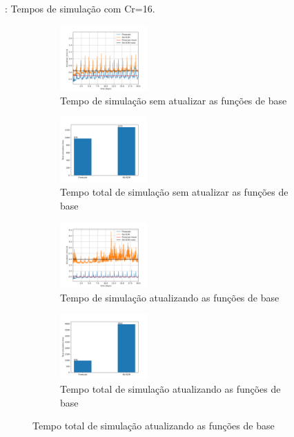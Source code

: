 \documentclass[professionalfont]{beamer}
\begin{document}
\begin{frame}{\FrameProblemName: {\small Tempos de simulação com Cr=16.}}
    \begin{figure}[!h]
        \centering
        \begin{subfigure}{.48\textwidth}
            \centering
            \includegraphics[height=2.5cm]{./imgs/pr3/cr16/no_update/tempo_simulacao.png}
            \caption{Tempo de simulação sem atualizar as funções de base}
        \end{subfigure}
        \hfill
        \begin{subfigure}{.48\textwidth}
            \centering
            \includegraphics[height=2.5cm]{./imgs/pr3/cr16/no_update/tempo_total.png}
            \caption{Tempo total de simulação sem atualizar as funções de base}
        \end{subfigure}
        \bigskip
        \begin{subfigure}{.48\textwidth}
            \centering
            \includegraphics[height=2.5cm]{./imgs/pr3/cr16/Update/tempo_simulacao.png}
            \caption{Tempo de simulação atualizando as funções de base}
        \end{subfigure}
        \hfill
        \begin{subfigure}{.48\textwidth}
            \centering
            \includegraphics[height=2.5cm]{./imgs/pr3/cr16/Update/tempo_total.png}
            \caption{Tempo total de simulação atualizando as funções de base}
        \end{subfigure}
    
        \label{fig:fig6_pr3-cr16}
    \end{figure}
    
\end{frame}
\end{document}
